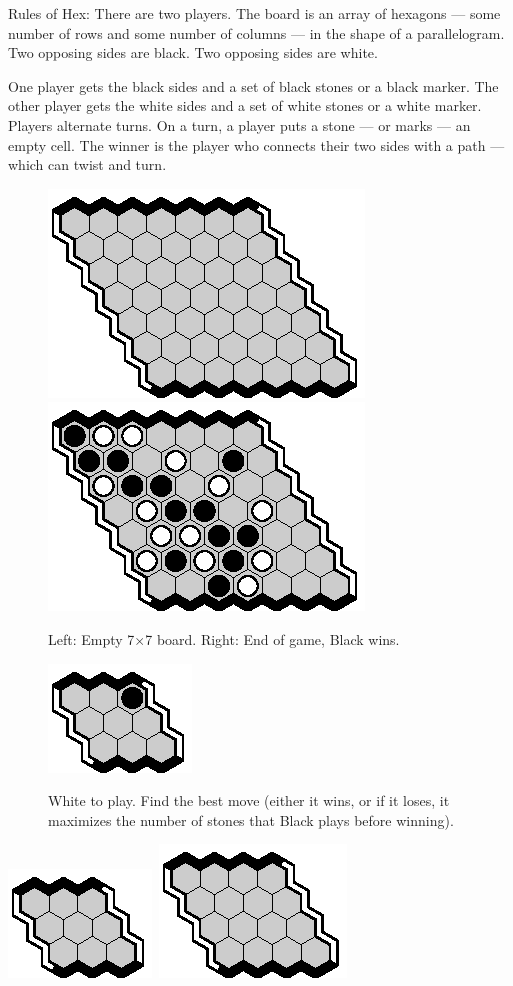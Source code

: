 \documentclass[12pt]{article}
\begin{document}
 
Rules of Hex:
There are two players.
The board is an array of hexagons
--- some number of rows and some number of columns ---
in the shape of a parallelogram.
Two opposing sides are black.
Two opposing sides are white.

One player gets the black sides
and a set of black stones or a black marker.
The other player gets the white sides
and a set of white stones or a white marker.
Players alternate turns.
On a turn, a player puts a stone --- or marks --- an empty cell.
The winner is the player who connects their two sides
with a path --- which can twist and turn.

\begin{figure}[hbp]
\hfill\includegraphics[scale=1.5]{pix/7x7-empty.eps}\
\hfill\includegraphics[scale=1.5]{pix/7x7-f1b6.eps}\hfill~
\caption{Left: Empty 7$\times$7 board. Right: End of game, Black wins.}
\end{figure}

\begin{figure}[hbp]
\hfill\includegraphics[scale=1.2]{pix/swap0.eps}\hfill~
\caption{White to play. Find the best move (either it wins,
or if it loses, it maximizes the number of stones that Black
plays before winning).}
\end{figure}

\hfill\includegraphics[scale=1.2]{pix/3x3.eps}\
\hfill\includegraphics[scale=1.2]{pix/4x4.eps}\hfill~
\end{document}

